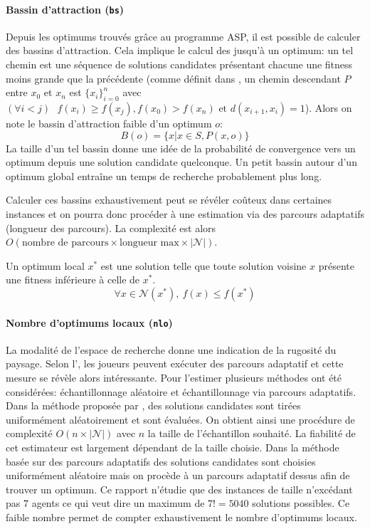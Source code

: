 \documentclass[../main.tex]{subfiles}
\begin{document}
	\paragraph{Bassin d'attraction (\texttt{bs})}{Depuis les optimums trouvés grâce au programme ASP, il est possible de calculer des bassins d'attraction. Cela implique le calcul des  jusqu'à un optimum: un tel chemin est une séquence de solutions candidates présentant chacune une fitness moins grande que la précédente (comme définit dans \cite{pitzer}, un chemin descendant $P$ entre $x_0$ et $x_n$ est $\{x_i\}_{i=0}^n$ avec $(\forall i < j)\text{ }f(x_i) \geq f(x_j), f(x_0) > f(x_n) \text{ et } d(x_{i+1}, x_i) = 1$). Alors on note le bassin d'attraction faible d'un optimum $o$:
	\begin{equation*}
	    B(o) = \{x | x \in S, P(x, o)\}
	\end{equation*}
La taille d'un tel bassin donne une idée de la probabilité de convergence vers un optimum depuis une solution candidate quelconque. Un petit bassin autour d'un optimum global entraîne un temps de recherche probablement plus long.

Calculer ces bassins exhaustivement peut se révéler coûteux dans certaines instances et on pourra donc procéder à une estimation via des parcours adaptatifs \cite{garnier} (longueur des parcours). La complexité est alors $O(\text{nombre de parcours} \times \text{longueur max} \times |\mathcal{N}|)$.
	}
	
\begin{definition}
    Un optimum local $x^*$ est une solution telle que toute solution voisine $x$ présente une fitness inférieure à celle de $x^*$.
    \begin{equation*}
        \forall x \in \mathcal{N}(x^*),~f(x) \leq f(x^*)
    \end{equation*}
\end{definition}

    \paragraph{Nombre d'optimums locaux (\texttt{nlo})}{
La modalité de l'espace de recherche donne une indication de la rugosité du paysage. Selon l', les joueurs peuvent exécuter des parcours adaptatif et cette mesure se révèle alors intéressante. Pour l'estimer plusieurs méthodes ont été considérées: échantillonnage aléatoire et échantillonnage via parcours adaptatifs. Dans la méthode proposée par \cite{alyahya}, des solutions candidates sont tirées uniformément aléatoirement et sont évaluées. On obtient ainsi une procédure de complexité $O(n \times |\mathcal{N}|)$ avec $n$ la taille de l'échantillon souhaité. La fiabilité de cet estimateur est largement dépendant de la taille choisie. Dans la méthode basée sur des parcours adaptatifs des solutions candidates sont choisies uniformément aléatoire mais on procède à un parcours adaptatif dessus afin de trouver un optimum. Ce rapport n'étudie que des instances de taille n'excédant pas $7$ agents ce qui veut dire un maximum de $7! = 5040$ solutions possibles. Ce faible nombre permet de compter exhaustivement le nombre d'optimums locaux.
    }
	
\end{document}
